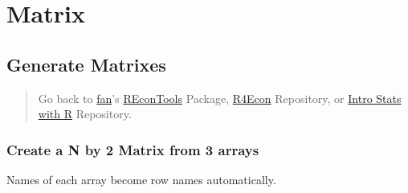 \documentclass[
]{book}
\newenvironment{Shaded}{\begin{snugshade}}{\end{snugshade}}
\newcommand{\DecValTok}[1]{\textcolor[rgb]{0.00,0.00,0.81}{#1}}
\newcommand{\FloatTok}[1]{\textcolor[rgb]{0.00,0.00,0.81}{#1}}
\newcommand{\KeywordTok}[1]{\textcolor[rgb]{0.13,0.29,0.53}{\textbf{#1}}}
\newcommand{\NormalTok}[1]{#1}
\newcommand{\OperatorTok}[1]{\textcolor[rgb]{0.81,0.36,0.00}{\textbf{#1}}}
\newcommand{\StringTok}[1]{\textcolor[rgb]{0.31,0.60,0.02}{#1}}
\begin{document}
\hypertarget{matrix}{%
\section{Matrix}\label{matrix}}

\hypertarget{generate-matrixes}{%
\subsection{Generate Matrixes}\label{generate-matrixes}}

\begin{quote}
Go back to \href{http://fanwangecon.github.io/CodeDynaAsset/}{fan}'s \href{https://fanwangecon.github.io/REconTools/}{REconTools} Package, \href{https://fanwangecon.github.io/R4Econ/}{R4Econ} Repository, or \href{https://fanwangecon.github.io/Stat4Econ/}{Intro Stats with R} Repository.
\end{quote}

\hypertarget{create-a-n-by-2-matrix-from-3-arrays}{%
\subsubsection{Create a N by 2 Matrix from 3 arrays}\label{create-a-n-by-2-matrix-from-3-arrays}}

Names of each array become row names automatically.

\begin{Shaded}
\end{Shaded}

\begin{table}[!h]
\centering
{}
\end{table}
\end{document}
